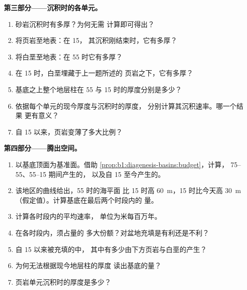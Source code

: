 \begin{problem}
\noindent\textbf{第三部分——沉积时的各单元。}
\begin{enumerate}[resume]
  \item 砂岩沉积时有多厚？为何无需
        计算即可得出？
  \item 将页岩至地表：在 \qty{15}{\Ma}，
        其沉积刚结束时，它有多厚？
  \item 将白垩至地表：在 \qty{55}{\Ma} 时它有多厚？
  \item 在 \qty{15}{\Ma} 时，白垩埋藏于上一题所述的
        页岩之下，它有多厚？
  \item 基底之上整个地层柱在 \qty{55}{\Ma}
        与 \qty{15}{\Ma} 时的厚度分别是多少？
  \item 依据每个单元的现今厚度与沉积时的厚度，
        分别计算其沉积速率。哪一个结果
        更有意义？
  \item 自 \qty{15}{\Ma} 以来，页岩变薄了多大比例？
\end{enumerate}

\noindent\textbf{第四部分——腾出空间。}
\begin{enumerate}[resume]
  \item 以基底顶面为基准面。借助
        \cref{prop:b1:diagenesis-basins:budget}，计算，
        \qtyrange{75}{55}{\Ma}、\qtyrange{55}{15}{\Ma} 期间产生的，
        以及自 \qty{15}{\Ma} 至今产生的。
  \item 该地区的曲线给出，\qty{55}{\Ma} 时的海平面
        比 \qty{15}{\Ma} 时高 \qty{60}{m}，\qty{15}{\Ma} 时比今天高 \qty{30}{m}
        （假定值）。计算基底在最后两个时段内的
        量。
  \item 计算各时段内的平均速率，
        单位为米每百万年。
  \item 在各时段内，须占量的
        多大份额？对盆地充填是有利还是不利？
  \item 自 \qty{15}{\Ma} 以来被充填的中，
        其中有多少由下方页岩与白垩的产生？
  \item 为何无法根据现今地层柱的厚度
        读出基底的量？
  \item 页岩单元沉积时的厚度是多少？
\end{enumerate}
\end{problem}
